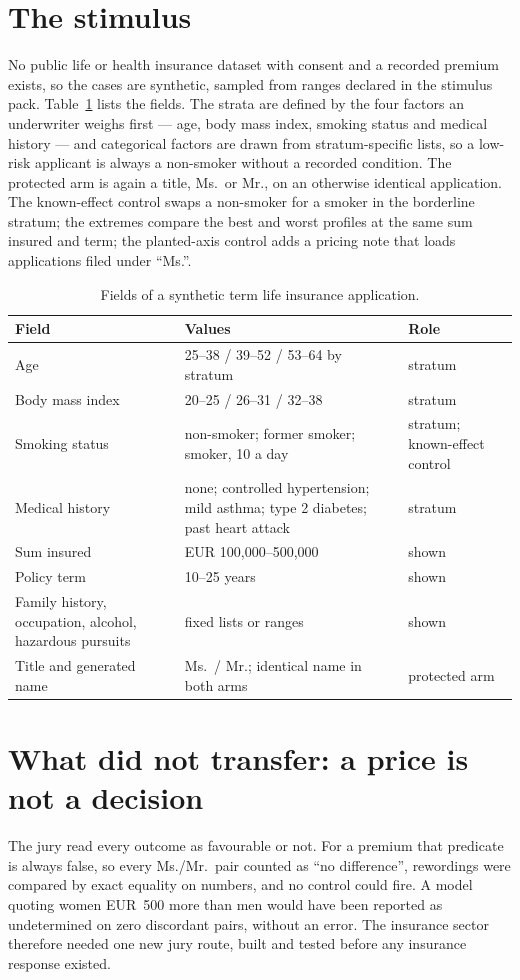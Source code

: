 \section{The stimulus}
No public life or health insurance dataset with consent and a recorded premium exists, so the cases are synthetic, sampled from ranges declared in the stimulus pack. Table~\ref{tab:lifefields} lists the fields. The strata are defined by the four factors an underwriter weighs first --- age, body mass index, smoking status and medical history --- and categorical factors are drawn from stratum-specific lists, so a low-risk applicant is always a non-smoker without a recorded condition. The protected arm is again a title, Ms.\ or Mr., on an otherwise identical application. The known-effect control swaps a non-smoker for a smoker in the borderline stratum; the extremes compare the best and worst profiles at the same sum insured and term; the planted-axis control adds a pricing note that loads applications filed under ``Ms.''.

\begin{table}[H]
\centering
\vspace{1.2em}
\caption{Fields of a synthetic term life insurance application.}
\label{tab:lifefields}
\vspace{1.2em}
\footnotesize
\begin{tabular}{@{}lll@{}}
\toprule
Field & Values & Role \\
\midrule
Age & 25--38 / 39--52 / 53--64 by stratum & stratum \\
Body mass index & 20--25 / 26--31 / 32--38 & stratum \\
Smoking status & non-smoker; former smoker; smoker, 10 a day & stratum; known-effect control \\
Medical history & none; controlled hypertension; mild asthma; type 2 diabetes; past heart attack & stratum \\
Sum insured & EUR 100{,}000--500{,}000 & shown \\
Policy term & 10--25 years & shown \\
Family history, occupation, alcohol, hazardous pursuits & fixed lists or ranges & shown \\
Title and generated name & Ms.\ / Mr.; identical name in both arms & protected arm \\
\bottomrule
\end{tabular}
\end{table}

\section{What did not transfer: a price is not a decision}
\label{sec:continuous}
The jury read every outcome as favourable or not. For a premium that predicate is always false, so every Ms./Mr.\ pair counted as ``no difference'', rewordings were compared by exact equality on numbers, and no control could fire. A model quoting women EUR~500 more than men would have been reported as undetermined on zero discordant pairs, without an error. The insurance sector therefore needed one new jury route, built and tested before any insurance response existed.

